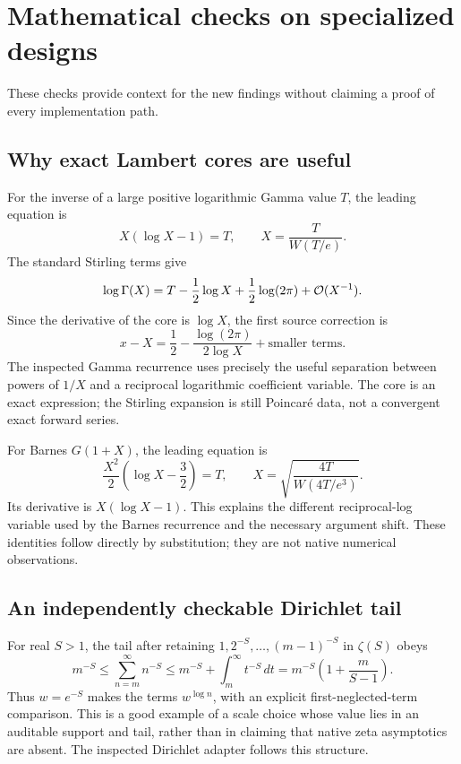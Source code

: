 \section{Mathematical checks on specialized designs}

These checks provide context for the new findings without claiming a proof of every implementation path.

\subsection{Why exact Lambert cores are useful}

For the inverse of a large positive logarithmic Gamma value $T$, the leading equation is
\[
 X(\log X-1)=T,\qquad X=\frac{T}{W(T/e)}.
\]
The standard Stirling terms give
\[
 \log\Gamma(X)=T-\frac12\log X+\frac12\log(2\pi)+\mathcal{O}(X^{-1}).
\]
Since the derivative of the core is $\log X$, the first source correction is
\[
 x-X=\frac12-\frac{\log(2\pi)}{2\log X}
       +\text{smaller terms}.
\]
The inspected Gamma recurrence uses precisely the useful separation between powers of $1/X$ and a reciprocal logarithmic coefficient variable. The core is an exact  expression; the Stirling expansion is still Poincar\'e data, not a convergent exact forward series.\cite{gamma,wl-productlog,dlmf511}

For Barnes $G(1+X)$, the leading equation is
\[
 \frac{X^2}{2}\left(\log X-\frac32\right)=T,
 \qquad X=\sqrt{\frac{4T}{W(4T/e^3)}}.
\]
Its derivative is $X(\log X-1)$. This explains the different reciprocal-log variable used by the Barnes recurrence and the necessary argument shift. These identities follow directly by substitution; they are not native numerical observations.\cite{barnes,dlmf517}

\subsection{An independently checkable Dirichlet tail}

For real $S>1$, the tail after retaining $1,2^{-S},\ldots,(m-1)^{-S}$ in $\zeta(S)$ obeys
\begin{equation}
 m^{-S}\leq\sum_{n=m}^{\infty}n^{-S}
 \leq m^{-S}+\int_m^\infty t^{-S}\,dt
 =m^{-S}\left(1+\frac{m}{S-1}\right).
\end{equation}
Thus $w=e^{-S}$ makes the terms $w^{\log n}$, with an explicit first-neglected-term comparison. This is a good example of a scale choice whose value lies in an auditable support and tail, rather than in claiming that native zeta asymptotics are absent. The inspected Dirichlet adapter follows this structure.\cite{dirichlet}

